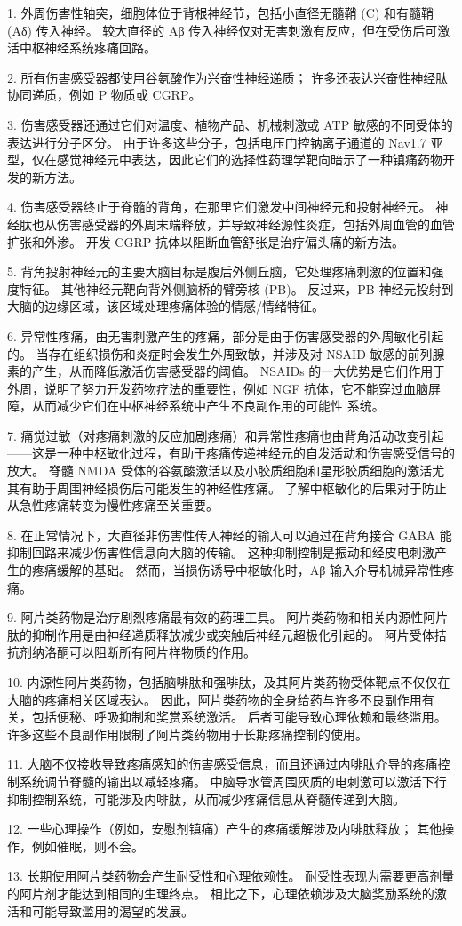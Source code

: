 1. 外周伤害性轴突，细胞体位于背根神经节，包括小直径无髓鞘 (C) 和有髓鞘 (Aδ) 传入神经。
较大直径的 Aβ 传入神经仅对无害刺激有反应，但在受伤后可激活中枢神经系统疼痛回路。 


2. 所有伤害感受器都使用谷氨酸作为兴奋性神经递质； 许多还表达兴奋性神经肽协同递质，例如 P 物质或 CGRP。


3. 伤害感受器还通过它们对温度、植物产品、机械刺激或 ATP 敏感的不同受体的表达进行分子区分。
由于许多这些分子，包括电压门控钠离子通道的 Nav1.7 亚型，仅在感觉神经元中表达，因此它们的选择性药理学靶向暗示了一种镇痛药物开发的新方法。


4. 伤害感受器终止于脊髓的背角，在那里它们激发中间神经元和投射神经元。
神经肽也从伤害感受器的外周末端释放，并导致神经源性炎症，包括外周血管的血管扩张和外渗。
开发 CGRP 抗体以阻断血管舒张是治疗偏头痛的新方法。 


5. 背角投射神经元的主要大脑目标是腹后外侧丘脑，它处理疼痛刺激的位置和强度特征。
其他神经元靶向背外侧脑桥的臂旁核 (PB)。
反过来，PB 神经元投射到大脑的边缘区域，该区域处理疼痛体验的情感/情绪特征。
 

6. 异常性疼痛，由无害刺激产生的疼痛，部分是由于伤害感受器的外周敏化引起的。
当存在组织损伤和炎症时会发生外周致敏，并涉及对 NSAID 敏感的前列腺素的产生，从而降低激活伤害感受器的阈值。
NSAIDs 的一大优势是它们作用于外周，说明了努力开发药物疗法的重要性，例如 NGF 抗体，它不能穿过血脑屏障，从而减少它们在中枢神经系统中产生不良副作用的可能性 系统。 


7. 痛觉过敏（对疼痛刺激的反应加剧疼痛）和异常性疼痛也由背角活动改变引起——这是一种中枢敏化过程，有助于疼痛传递神经元的自发活动和伤害感受信号的放大。
脊髓 NMDA 受体的谷氨酸激活以及小胶质细胞和星形胶质细胞的激活尤其有助于周围神经损伤后可能发生的神经性疼痛。
了解中枢敏化的后果对于防止从急性疼痛转变为慢性疼痛至关重要。 


8. 在正常情况下，大直径非伤害性传入神经的输入可以通过在背角接合 GABA 能抑制回路来减少伤害性信息向大脑的传输。
这种抑制控制是振动和经皮电刺激产生的疼痛缓解的基础。
然而，当损伤诱导中枢敏化时，Aβ 输入介导机械异常性疼痛。
 

9. 阿片类药物是治疗剧烈疼痛最有效的药理工具。
阿片类药物和相关内源性阿片肽的抑制作用是由神经递质释放减少或突触后神经元超极化引起的。
阿片受体拮抗剂纳洛酮可以阻断所有阿片样物质的作用。 


10. 内源性阿片类药物，包括脑啡肽和强啡肽，及其阿片类药物受体靶点不仅仅在大脑的疼痛相关区域表达。
因此，阿片类药物的全身给药与许多不良副作用有关，包括便秘、呼吸抑制和奖赏系统激活。
后者可能导致心理依赖和最终滥用。
许多这些不良副作用限制了阿片类药物用于长期疼痛控制的使用。


11. 大脑不仅接收导致疼痛感知的伤害感受信息，而且还通过内啡肽介导的疼痛控制系统调节脊髓的输出以减轻疼痛。
中脑导水管周围灰质的电刺激可以激活下行抑制控制系统，可能涉及内啡肽，从而减少疼痛信息从脊髓传递到大脑。


12. 一些心理操作（例如，安慰剂镇痛）产生的疼痛缓解涉及内啡肽释放；
其他操作，例如催眠，则不会。


13. 长期使用阿片类药物会产生耐受性和心理依赖性。
耐受性表现为需要更高剂量的阿片剂才能达到相同的生理终点。
相比之下，心理依赖涉及大脑奖励系统的激活和可能导致滥用的渴望的发展。

